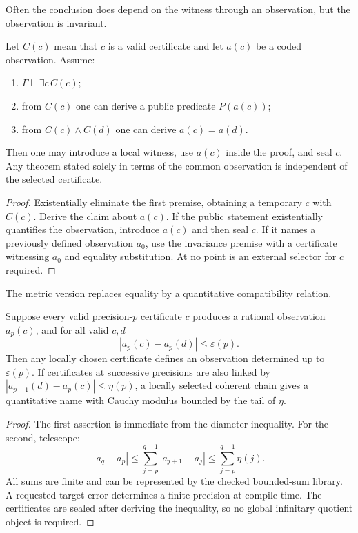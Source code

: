 Often the conclusion does depend on the witness through an observation, but the observation is
invariant.

\begin{theorem}\label{thm:observer-exact}
Let \(C(c)\) mean that \(c\) is a valid certificate and let \(a(c)\) be a coded observation.  Assume:
\begin{enumerate}
\item \(\Gamma\vdash\exists c\,C(c)\);
\item from \(C(c)\) one can derive a public predicate \(P(a(c))\);
\item from \(C(c)\land C(d)\) one can derive \(a(c)=a(d)\).
\end{enumerate}
Then one may introduce a local witness, use \(a(c)\) inside the proof, and seal \(c\).  Any theorem
stated solely in terms of the common observation is independent of the selected certificate.
\end{theorem}

\begin{proof}
Existentially eliminate the first premise, obtaining a temporary \(c\) with \(C(c)\).  Derive the
claim about \(a(c)\).  If the public statement existentially quantifies the observation, introduce
\(a(c)\) and then seal \(c\).  If it names a previously defined observation \(a_0\), use the
invariance premise with a certificate witnessing \(a_0\) and equality substitution.  At no point is
an external selector for \(c\) required.
\end{proof}

The metric version replaces equality by a quantitative compatibility relation.

\begin{theorem}\label{thm:observer-metric}
Suppose every valid precision-\(p\) certificate \(c\) produces a rational observation \(a_p(c)\), and
for all valid \(c,d\)
\[
  |a_p(c)-a_p(d)|\le \varepsilon(p).
\]
Then any locally chosen certificate defines an observation determined up to \(\varepsilon(p)\).  If
certificates at successive precisions are also linked by
\(|a_{p+1}(d)-a_p(c)|\le\eta(p)\), a locally selected coherent chain gives a quantitative name with
Cauchy modulus bounded by the tail of \(\eta\).
\end{theorem}

\begin{proof}
The first assertion is immediate from the diameter inequality.  For the second, telescope:
\[
 |a_q-a_p|\le\sum_{j=p}^{q-1}|a_{j+1}-a_j|
             \le\sum_{j=p}^{q-1}\eta(j).
\]
All sums are finite and can be represented by the checked bounded-sum library.  A requested target
error determines a finite precision at compile time.  The certificates are sealed after deriving the
inequality, so no global infinitary quotient object is required.
\end{proof}

